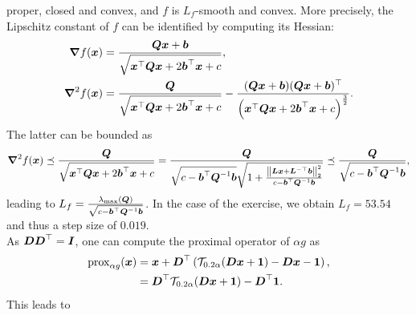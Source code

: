 proper, closed and convex, and $f$ is $L_f$-smooth and convex. 
More precisely, the Lipschitz constant of $f$ can be identified by computing its 
Hessian: 
\begin{align*}
\boldsymbol \nabla f(\boldsymbol x) & = \frac{\boldsymbol{Qx}+\boldsymbol b}{\sqrt{\boldsymbol x^\top \boldsymbol{Qx} + 
2 \boldsymbol b^\top \boldsymbol x + c}}, \\
\boldsymbol \nabla^2 f(\boldsymbol x) & = \frac{\boldsymbol Q}{\sqrt{\boldsymbol x^\top \boldsymbol{Qx} + 
2 \boldsymbol b^\top \boldsymbol x + c}} - \frac{(\boldsymbol{Qx}+\boldsymbol b)(\boldsymbol{Qx}+\boldsymbol b)^\top}{\left(\boldsymbol x^\top \boldsymbol{Qx} + 
2 \boldsymbol b^\top \boldsymbol x + c\right)^{\frac{3}{2}}}. 
\end{align*}
The latter can be bounded as 
\begin{align*}
	\boldsymbol \nabla^2 f(\boldsymbol x) \preceq  \frac{\boldsymbol Q }{\sqrt{\boldsymbol x^\top \boldsymbol{Qx} + 
2 \boldsymbol b^\top \boldsymbol x + c}} = \frac{\boldsymbol Q }{ \sqrt{c -\boldsymbol b^\top\boldsymbol Q^{-1} \boldsymbol b} \sqrt{1+\frac{\left \| \boldsymbol{Lx} + \boldsymbol L^{-\top} \boldsymbol b \right \|_2^2}{ c -\boldsymbol b^\top\boldsymbol Q^{-1} \boldsymbol b}}} \preceq \frac{\boldsymbol Q }{ \sqrt{c -\boldsymbol b^\top\boldsymbol Q^{-1} \boldsymbol b}},
\end{align*}
leading to $L_f = \frac{\lambda_{\text{max}}\left(\boldsymbol Q\right)}{\sqrt{c -\boldsymbol b^\top\boldsymbol Q^{-1} \boldsymbol b}}$. In the case of the exercise, we obtain $L_f = 53.54$ and thus a step size of  $0.019$. \\
As $\boldsymbol D \boldsymbol D^\top = \boldsymbol I$, one can compute the proximal operator of $\alpha g$ as 
\begin{align*}
	\operatorname{prox}_{\alpha g}(\boldsymbol x) & = \boldsymbol x + \boldsymbol D^\top \left( 
\mathcal T_{0.2\alpha} (\boldsymbol{Dx}+\boldsymbol 1) - \boldsymbol{Dx} - \boldsymbol 1 \right),\\
 & =  \boldsymbol D^\top 
\mathcal T_{0.2\alpha} (\boldsymbol{Dx}+\boldsymbol 1) -\boldsymbol D^\top \boldsymbol 1 .
\end{align*}
This leads to 
